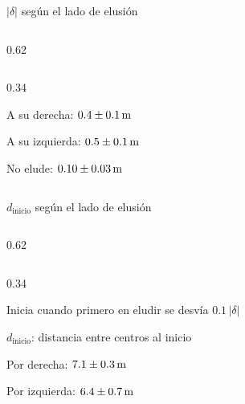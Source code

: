 \begin{frame}{$|\delta|$ según el lado de elusión}
  \begin{cols}
    \begin{column}{0.62\textwidth}
    \end{column}
    \begin{column}{0.34\textwidth}
      \begin{resultado}
        \item A su derecha: $0.4 \pm 0.1\,\mathrm{m}$
        \item A su izquierda: $0.5 \pm 0.1\,\mathrm{m}$
        \item No elude: $0.10 \pm 0.03\,\mathrm{m}$
      \end{resultado}
    \end{column}
  \end{cols}
\end{frame}

\begin{frame}{$d_{\mathrm{inicio}}$ según el lado de elusión}
  \begin{cols}
    \begin{column}{0.62\textwidth}
    \end{column}
    \begin{column}{0.34\textwidth}
      \begin{parametros}
        \item Inicia cuando primero en eludir se desvía $0.1\,|\delta|$
        \item $d_{\mathrm{inicio}}$: distancia entre centros al inicio
      \end{parametros}
      \vspace{6pt}
      \begin{resultado}
        \item Por derecha: $7.1 \pm 0.3\,\mathrm{m}$
        \item Por izquierda: $6.4 \pm 0.7\,\mathrm{m}$
      \end{resultado}
    \end{column}
  \end{cols}
\end{frame}

